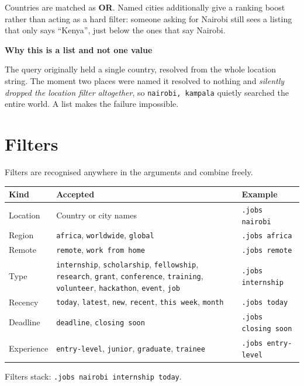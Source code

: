 \documentclass[11pt,a4paper]{report}
\newenvironment{callout}[1]
  {\begin{framed}\noindent\textbf{\textcolor{phcWarnInk}{#1}}\par\vspace{3pt}\small}
  {\end{framed}}
\begin{document}
Countries are matched as \textbf{OR}. Named cities additionally give a ranking
boost rather than acting as a hard filter: someone asking for Nairobi still
sees a listing that only says ``Kenya'', just below the ones that say Nairobi.

\begin{callout}{Why this is a list and not one value}
The query originally held a single country, resolved from the whole location
string. The moment two places were named it resolved to nothing and
\emph{silently dropped the location filter altogether}, so
\texttt{nairobi, kampala} quietly searched the entire world. A list makes the
failure impossible.
\end{callout}

\section{Filters}

Filters are recognised anywhere in the arguments and combine freely.

\begin{center}
\begin{tabularx}{\textwidth}{@{}lXl@{}}
\toprule
\textbf{Kind} & \textbf{Accepted} & \textbf{Example} \\
\midrule
Location & Country or city names & \texttt{.jobs nairobi} \\
Region & \texttt{africa}, \texttt{worldwide}, \texttt{global} &
\texttt{.jobs africa} \\
Remote & \texttt{remote}, \texttt{work from home} & \texttt{.jobs remote} \\
Type & \texttt{internship}, \texttt{scholarship}, \texttt{fellowship},
\texttt{research}, \texttt{grant}, \texttt{conference}, \texttt{training},
\texttt{volunteer}, \texttt{hackathon}, \texttt{event}, \texttt{job} &
\texttt{.jobs internship} \\
Recency & \texttt{today}, \texttt{latest}, \texttt{new}, \texttt{recent},
\texttt{this week}, \texttt{month} & \texttt{.jobs today} \\
Deadline & \texttt{deadline}, \texttt{closing soon} &
\texttt{.jobs closing soon} \\
Experience & \texttt{entry-level}, \texttt{junior}, \texttt{graduate},
\texttt{trainee} & \texttt{.jobs entry-level} \\
\bottomrule
\end{tabularx}
\end{center}

Filters stack: \texttt{.jobs nairobi internship today}.
\end{document}
